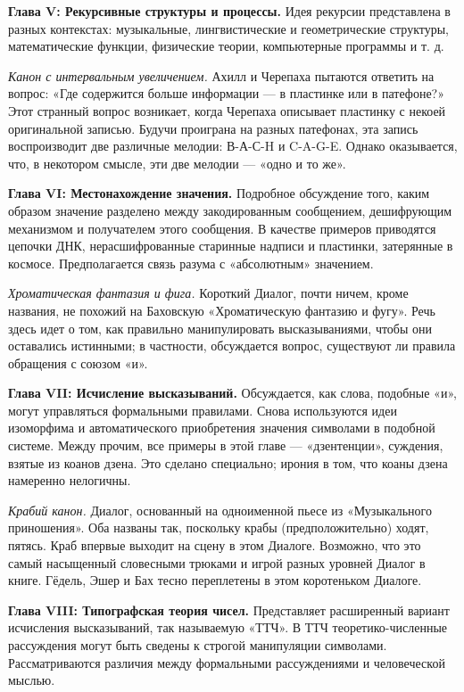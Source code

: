 \textbf{Глава V: Рекурсивные структуры и процессы.} Идея рекурсии представлена в разных контекстах: музыкальные, лингвистические и геометрические структуры, математические функции, физические теории, компьютерные программы и т. д.

\emph{Канон с интервальным увеличением.} Ахилл и Черепаха пытаются ответить на вопрос: «Где содержится больше информации --- в пластинке или в патефоне?» Этот странный вопрос возникает, когда Черепаха описывает пластинку с некоей оригинальной записью. Будучи проиграна на разных патефонах, эта запись воспроизводит две различные мелодии: В-А-С-H и C-A-G-E. Однако оказывается, что, в некотором смысле, эти две мелодии --- «одно и то же».

\textbf{Глава VI: Местонахождение значения.} Подробное обсуждение того, каким образом значение разделено между закодированным сообщением, дешифрующим механизмом и получателем этого сообщения. В качестве примеров приводятся цепочки ДНК, нерасшифрованные старинные надписи и пластинки, затерянные в космосе. Предполагается связь разума с «абсолютным» значением.

\emph{Хроматическая фантазия и фига.} Короткий Диалог, почти ничем, кроме названия, не похожий на Баховскую «Хроматическую фантазию и фугу». Речь здесь идет о том, как правильно манипулировать высказываниями, чтобы они оставались истинными; в частности, обсуждается вопрос, существуют ли правила обращения с союзом «и».

\textbf{Глава VII: Исчисление высказываний.} Обсуждается, как слова, подобные «и», могут управляться формальными правилами. Снова используются идеи изоморфима и автоматического приобретения значения символами в подобной системе. Между прочим, все примеры в этой главе --- «дзентенции», суждения, взятые из коанов дзена. Это сделано специально; ирония в том, что коаны дзена намеренно нелогичны.

\emph{Крабий канон.} Диалог, основанный на одноименной пьесе из «Музыкального приношения». Оба названы так, поскольку крабы (предположительно) ходят, пятясь. Краб впервые выходит на сцену в этом Диалоге. Возможно, что это самый насыщенный словесными трюками и игрой разных уровней Диалог в книге. Гёдель, Эшер и Бах тесно переплетены в этом коротеньком Диалоге.

\textbf{Глава VIII: Типографская теория чисел.} Представляет расширенный вариант исчисления высказываний, так называемую «ТТЧ». В ТТЧ теоретико-численные рассуждения могут быть сведены к строгой манипуляции символами. Рассматриваются различия между формальными рассуждениями и человеческой мыслью.

